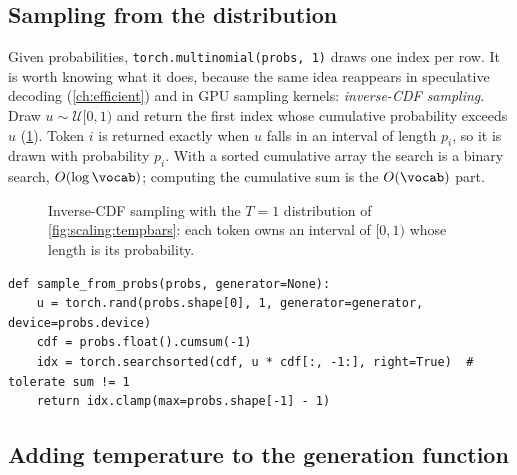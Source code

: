 \subsection{Sampling from the distribution}\label{sec:scaling:sample}

Given probabilities, \texttt{torch.multinomial(probs, 1)} draws one index per row. It is worth
knowing what it does, because the same idea reappears in speculative decoding (\cref{ch:efficient})
and in GPU sampling kernels: \emph{inverse-CDF sampling}. Draw $u \sim \mathcal{U}[0,1)$ and return
the first index whose cumulative probability exceeds $u$ (\cref{fig:scaling:icdf}). Token $i$ is
returned exactly when $u$ falls in an interval of length $p_i$, so it is drawn with probability
$p_i$. With a sorted cumulative array the search is a binary search, $O(\log \vocab)$; computing the
cumulative sum is the $O(\vocab)$ part.

\begin{figure}[t]
\centering
{}
\caption{Inverse-CDF sampling with the $T=1$ distribution of \cref{fig:scaling:tempbars}: each
token owns an interval of $[0,1)$ whose length is its probability.}
\label{fig:scaling:icdf}
\end{figure}

\begin{lstlisting}[caption={Inverse-CDF sampling, one token per row (Lab 22, Task 3).},label={lst:scaling:icdf}]
def sample_from_probs(probs, generator=None):
    u = torch.rand(probs.shape[0], 1, generator=generator, device=probs.device)
    cdf = probs.float().cumsum(-1)
    idx = torch.searchsorted(cdf, u * cdf[:, -1:], right=True)  # tolerate sum != 1
    return idx.clamp(max=probs.shape[-1] - 1)
\end{lstlisting}

\subsection{Adding temperature to the generation function}\label{sec:scaling:addtemp}

